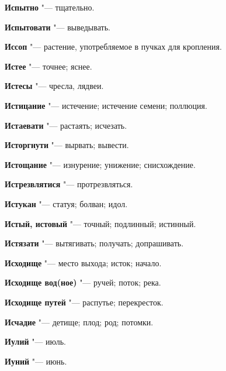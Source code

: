 \begin{mymulticols}{2}
\noindent\textbf{Испытно} "--- тщательно. 




\noindent\textbf{Испытовати} "--- выведывать. 




\noindent\textbf{Иссоп} "--- растение, употребляемое в пучках для кропления. 




\noindent\textbf{Истее} "--- точнее; яснее. 




\noindent\textbf{Истесы} "--- чресла, лядвеи. 




\noindent\textbf{Истицание} "--- истечение; истечение семени; поллюция. 




\noindent\textbf{Истаевати} "--- растаять; исчезать. 




\noindent\textbf{Исторгнути} "--- вырвать; вывести. 




\noindent\textbf{Истощание} "--- изнурение; унижение; снисхождение. 




\noindent\textbf{Истрезвлятися} "--- протрезвляться. 




\noindent\textbf{Истукан} "--- статуя; болван; идол. 




\noindent\textbf{Истый, истовый} "--- точный; подлинный; истинный. 




\noindent\textbf{Истязати} "--- вытягивать; получать; допрашивать. 




\noindent\textbf{Исходище} "--- место выхода; исток; начало. 




\noindent\textbf{Исходище вод(ное)} "--- ручей; поток; река. 




\noindent\textbf{Исходище путей} "--- распутье; перекресток. 




\noindent\textbf{Исчадие} "--- детище; плод; род; потомки. 




\noindent\textbf{Иулий} "--- июль. 




\noindent\textbf{Иуний} "--- июнь. 





\end{mymulticols}
